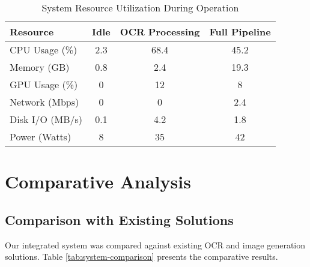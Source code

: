 \begin{table}[h!]
\centering
\caption{System Resource Utilization During Operation}
\label{tab:resource-utilization}
\begin{tabular}{|l|c|c|c|}
\hline
\textbf{Resource} & \textbf{Idle} & \textbf{OCR Processing} & \textbf{Full Pipeline} \\
\hline
CPU Usage (\%) & 2.3 & 68.4 & 45.2 \\
Memory (GB) & 0.8 & 2.4 & 19.3 \\
GPU Usage (\%) & 0 & 12 & 8 \\
Network (Mbps) & 0 & 0 & 2.4 \\
Disk I/O (MB/s) & 0.1 & 4.2 & 1.8 \\
Power (Watts) & 8 & 35 & 42 \\
\hline
\end{tabular}
\end{table}

\section{Comparative Analysis}
\label{sec:comparative-analysis}

\subsection{Comparison with Existing Solutions}

Our integrated system was compared against existing OCR and image generation solutions. Table \ref{tab:system-comparison} presents the comparative results.

\begin{table}[h!]
\centering
\caption{Comparison with Existing OCR and Image Generation Systems}
\label{tab:system-comparison}
\end{table}

